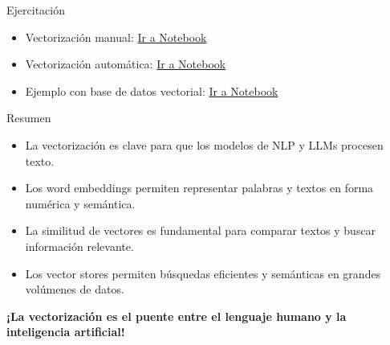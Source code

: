 \documentclass[aspectratio=169,xcolor=dvipsnames, t]{beamer}
\begin{document}
\begin{frame}{Ejercitación}
    \begin{itemize}
        \item Vectorización manual: \href{https://colab.research.google.com/drive/1lWR99IhnOiHOnKlOUWuQlBL8pcHY5PD5\#scrollTo=Fx-0HLDUK_wM}{Ir a Notebook}
        \item Vectorización automática: \href{https://colab.research.google.com/drive/10Ds4ZQdVTWCi_ZxqktKeMYL76MM1uiXm\#scrollTo=0HSh_TkDow-W}{Ir a Notebook}        
        \item Ejemplo con base de datos vectorial: \href{https://colab.research.google.com/drive/1-gbWhC5NyxAoB8Rd9KQm8k4eGlmw4GKL\#scrollTo=FR7XgQ_RwSY1}{Ir a Notebook}   
    \end{itemize}
\end{frame}

\begin{frame}{Resumen}
    \begin{itemize}
        \item La vectorización es clave para que los modelos de NLP y LLMs procesen texto.
        \item Los word embeddings permiten representar palabras y textos en forma numérica y semántica.
        \item La similitud de vectores es fundamental para comparar textos y buscar información relevante.
        \item Los vector stores permiten búsquedas eficientes y semánticas en grandes volúmenes de datos.
    \end{itemize}
    \vspace{0.3cm}
    \textbf{¡La vectorización es el puente entre el lenguaje humano y la inteligencia artificial!}
\end{frame}

\end{document}
